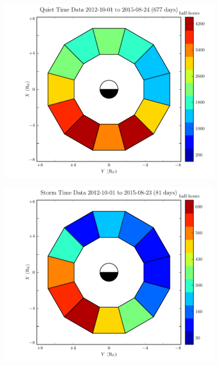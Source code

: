 \begin{figure}[!htb]
    \centering
    \includegraphics[width=\textwidth]{figures/pos_calm.pdf}
    \caption[Distribution of Usable Van Allen Probe Data: Dst $\geq \SI{-30}{\nT}$]{
      \todo{$\cdots$}
    }
    \label{fig_pos_calm}
\end{figure}

\begin{figure}[!htb]
    \centering
    \includegraphics[width=\textwidth]{figures/pos_storm.pdf}
    \caption[Distribution of Usable Van Allen Probe Data: Dst $< \SI{-30}{\nT}$]{
      \todo{$\cdots$}
    }
    \label{fig_pos_storm}
\end{figure}







